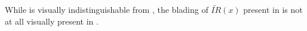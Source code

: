 While  is visually indistinguishable from , the blading of $\widetilde{IR}(x)$ present in  is not at all visually present in .
%
